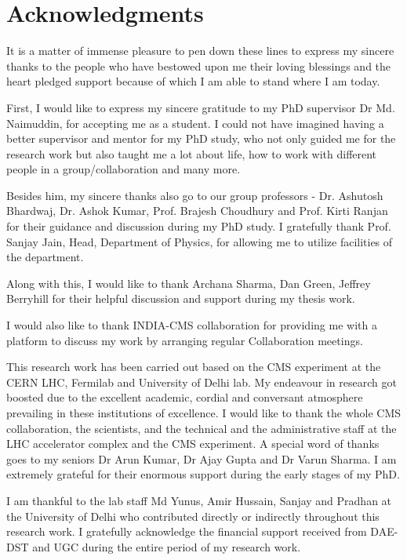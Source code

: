 
\chapter*{Acknowledgments}
It is a matter of immense pleasure to pen down these lines to express my sincere thanks to the people who have bestowed upon me their loving blessings and the heart pledged support because of which I am able to stand where I am today.

First, I would like to express my sincere gratitude to my PhD supervisor Dr Md. Naimuddin, for accepting me as a student. I could not have imagined having a better supervisor and mentor for my PhD study, who not only guided me for the research work but also taught me a lot about life, how to work with different people in a group/collaboration and many more.

Besides him, my sincere thanks also go to our group professors - Dr. Ashutosh Bhardwaj, Dr. Ashok Kumar, Prof. Brajesh Choudhury and Prof. Kirti Ranjan for their guidance and discussion during my PhD study. I gratefully thank Prof. Sanjay Jain, Head, Department of Physics, for allowing me to utilize facilities of the department. 

Along with this, I would like to thank Archana Sharma, Dan Green, Jeffrey Berryhill for their helpful discussion and support during my thesis work.

I would also like to thank INDIA-CMS collaboration for providing me with a platform to discuss my work by arranging regular Collaboration meetings. 

This research work has been carried out based on the CMS experiment at the CERN LHC, Fermilab and University of Delhi lab. My endeavour in research got boosted due to the excellent academic, cordial and conversant atmosphere prevailing in these institutions of excellence. I would like to thank the whole CMS collaboration, the scientists, and the technical and the administrative staff at the LHC accelerator complex and the CMS experiment. A special word of thanks goes to my seniors Dr Arun Kumar, Dr Ajay Gupta and Dr Varun Sharma. I am extremely grateful for their enormous support during the early stages of my PhD.

I am thankful to the lab staff Md Yunus, Amir Hussain, Sanjay and Pradhan at the University of Delhi who contributed directly or indirectly throughout this research work. I gratefully acknowledge the financial support received from DAE-DST and UGC during the entire period of my research work.

